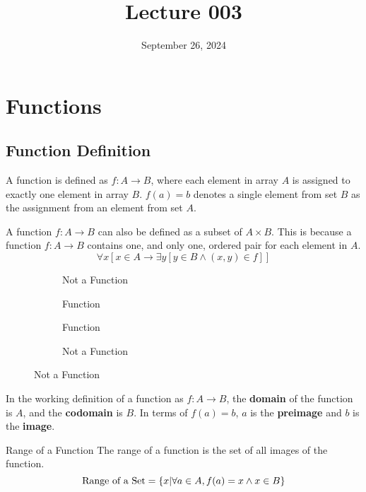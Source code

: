 \documentclass[12pt]{article}
\title{Lecture 003}
\date{September 26, 2024}
\begin{document}
\newpage
\section{Functions}
\label{sec:functions}

\subsection{Function Definition}
\label{ssec:functionDefinition}

A function is defined as $f: A \rightarrow B$, where each element in array $A$ is assigned
to exactly one element in array $B$. $f(a) = b$ denotes a single element from set $B$ as the
assignment from an element from set $A$.

A function $f: A \rightarrow B$ can also be defined as a subset of $A \times B$. This is because
a function $f: A \rightarrow B$ contains one, and only one, ordered pair for each element
in $A$.
\begin{equation*}
  \forall x [ x \in A \rightarrow \exists y [ y \in B \land (x,y) \in f]]
\end{equation*}

\begin{figure}[H]
  \centering
  \begin{subfigure}[H]{0.24\textwidth}
    \centering
    
    \caption{Not a Function}
    \label{fig:005}
  \end{subfigure}
  \begin{subfigure}[H]{0.24\textwidth}
    \centering
    
    \caption{Function}
    \label{fig:006}
  \end{subfigure}
  \begin{subfigure}[H]{0.24\textwidth}
    \centering
    
    \caption{Function}
    \label{fig:007}
  \end{subfigure}
  \begin{subfigure}[H]{0.24\textwidth}
    \centering
    
    \caption{Not a Function}
    \label{fig:008}
  \end{subfigure}
\end{figure}

In the working definition of a function as $f: A \rightarrow B$, the \textbf{domain} of the
function is $A$, and the \textbf{codomain} is $B$. In terms of $f(a) = b$, $a$ is the \textbf{preimage}
and $b$ is the \textbf{image}.

\begin{definition}{Range of a Function}
  The range of a function is the set of all images of the function.
  \begin{equation*}
    \textup{Range of a Set} = \{x|\forall a \in A, f(a) = x \land x \in B\}
  \end{equation*}
\end{definition}
\end{document}
